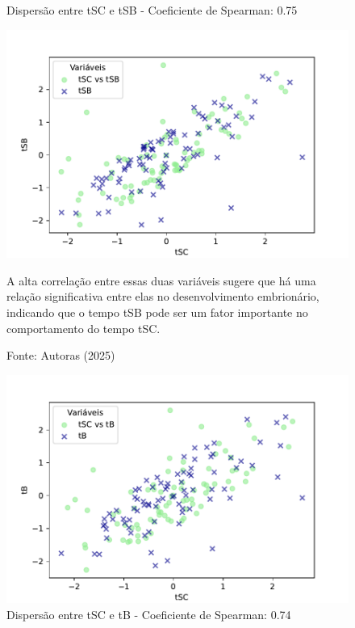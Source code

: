 \begin{figure}[h]
    \captionsetup{font=footnotesize, justification=centering, labelsep=period, position=above}
    \centering
    \begin{minipage}[b]{0.45\linewidth}
        \caption{Dispersão entre tSC e tSB - Coeficiente de Spearman: 0.75}
        \label{fig:tSC-tSB}
        \centering
        \includegraphics[scale=0.35]{figuras/Spearman/tSC-tSB.pdf}
        \vspace{0.3cm}
        \caption{A alta correlação entre essas duas variáveis sugere que há uma relação significativa entre elas no desenvolvimento embrionário, indicando que o tempo tSB pode ser um fator importante no comportamento do tempo tSC.}
        \begin{minipage}{\linewidth}
            \centering
            \scriptsize{Fonte: Autoras (2025)}
        \end{minipage}
    \end{minipage}
    \hspace{0.05\linewidth}
    \begin{minipage}[b]{0.45\linewidth}
        \caption{Dispersão entre tSC e tB - Coeficiente de Spearman: 0.74}
        \label{fig:tSC-tB}
        \centering
        \includegraphics[scale=0.35]{figuras/Spearman/tSC-tB.pdf}

\end{minipage}
\end{figure}
